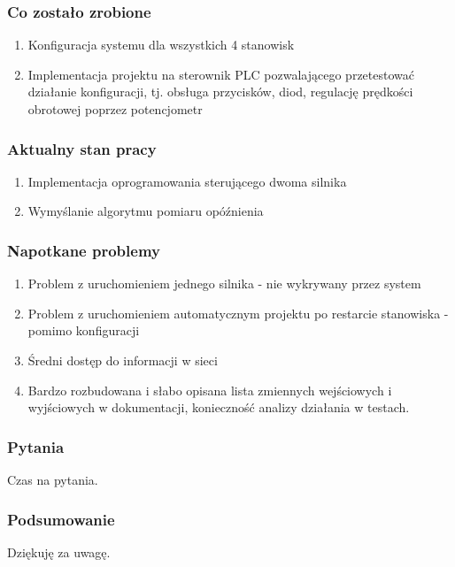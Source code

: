 \documentclass[ucs]{beamer}
\begin{document}
\begin{frame}
\frametitle{Co zostało zrobione}
\begin{enumerate}
    \item Konfiguracja systemu dla wszystkich 4 stanowisk
    \item Implementacja projektu na sterownik PLC pozwalającego przetestować działanie konfiguracji, tj. obsługa przycisków, diod, regulację prędkości obrotowej poprzez potencjometr
\end{enumerate}
\end{frame}

\begin{frame}
\frametitle{Aktualny stan pracy}
\begin{enumerate}
    \item Implementacja oprogramowania sterującego dwoma silnika
    \item Wymyślanie algorytmu pomiaru opóźnienia
\end{enumerate}
\end{frame}

\begin{frame}
\frametitle{Napotkane problemy}
\begin{enumerate}
    \item Problem z uruchomieniem jednego silnika - nie wykrywany przez system
    \item Problem z uruchomieniem automatycznym projektu po restarcie stanowiska - pomimo konfiguracji
	\item Średni dostęp do informacji w sieci
	\item Bardzo rozbudowana i słabo opisana lista zmiennych wejściowych i wyjściowych w dokumentacji, konieczność analizy działania w testach.
\end{enumerate}
\end{frame}

\begin{frame}
\frametitle{Pytania}
Czas na pytania.
\end{frame}

\begin{frame}
\frametitle{Podsumowanie}
Dziękuję za uwagę.
\end{frame}
\end{document}
